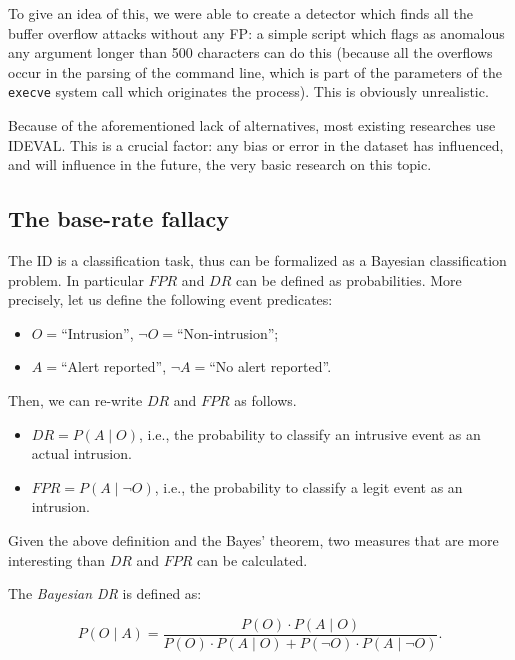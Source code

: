 To give an idea of this, we were able to create a detector which finds
all the buffer overflow attacks without any \ac{FP}: a simple script
which flags as anomalous any argument longer than 500 characters can
do this (because all the overflows occur in the parsing of the command
line, which is part of the parameters of the \texttt{execve} system
call which originates the process). This is obviously unrealistic.

Because of the aforementioned lack of alternatives, most existing
researches use \ac{IDEVAL}. This is a crucial factor: any bias or
error in the dataset has influenced, and will influence in the future,
the very basic research on this topic.

\subsection{The base-rate fallacy}
\label{detection:evaluation:base-rate-fallacy} The \ac{ID} is a
classification task, thus can be formalized as a Bayesian
classification problem. In particular $FPR$ and $DR$ can be defined as
probabilities. More precisely, let us define the following event
predicates:

\begin{itemize}
\item $O = $``Intrusion'', $\neg O =$``Non-intrusion'';
\item $A = $``Alert reported'', $\neg A =$``No alert reported''.
\end{itemize}

\noindent Then, we can re-write $DR$ and $FPR$ as follows.

\begin{itemize}
\item $DR = P(A \mid O)$, i.e., the probability to classify an
intrusive event as an actual intrusion.
\item $FPR = P(A \mid \neg O)$, i.e., the probability to classify a
legit event as an intrusion.
\end{itemize}

\noindent Given the above definition and the Bayes' theorem, two
measures that are more interesting than $DR$ and $FPR$ can be
calculated.

\begin{definition}[Bayesian \ac{DR}]
  The \emph{Bayesian \ac{DR}} \citep{axelsson:tissec2000:fallacy} is
  defined as:

  \begin{displaymath}
    P(O \mid A) = \frac{P(O) \cdot P(A \mid O)}{P(O) \cdot P(A \mid O)
    + P(\neg O) \cdot P(A \mid \neg O)}.
  \end{displaymath}
\end{definition}

